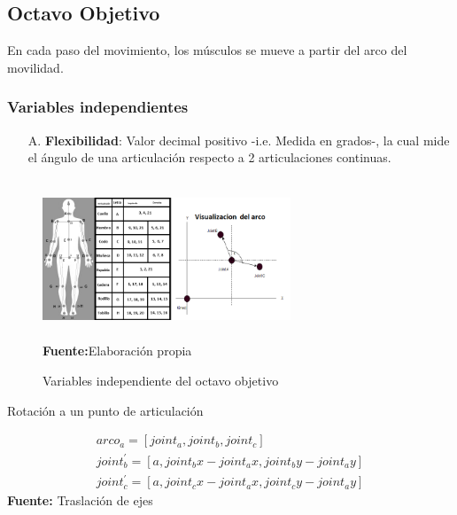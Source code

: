 \subsection{Octavo Objetivo} \label{vr:8o}
En cada paso del movimiento, los m\'usculos se mueve a partir del arco del  movilidad. 
\subsubsection{Variables independientes} \label{vr:8oi:indep}
\begin{enumerate}
	\item[A.] \textbf{Flexibilidad}: Valor decimal positivo -i.e. Medida en grados-, la cual mide el \'angulo de una articulaci\'on respecto a 2 articulaciones continuas.
\end{enumerate}	
\begin{figure}[H]
	\caption{Variables independiente del octavo  objetivo}
	\label{fig:varidep9}
	\centering
	\includegraphics[width=280px,height=180px]{graphics/EskeletanAngles.png} \\
	\textbf{Fuente:}Elaboraci\'on propia 
\end{figure}
\begin{formula}[h]
	\centering
	\caption{Rotaci\'on a un punto de articulaci\'on}
	\label{frm:rotEq}
	\begin{equation}
\begin{matrix}
arco_{a} = [joint_{a},joint_{b},joint_{c}]\\ 
joint_{b}^{'} = [a,joint_{b}x-joint_{a}x, joint_{b}y-joint_{a}y]\\ 
joint_{c}^{'} = [a,joint_{c}x-joint_{a}x, joint_{c}y-joint_{a}y]
\end{matrix}
	\end{equation}
	\textbf{Fuente:} Traslaci\'on de ejes \cite[p.~982]{aguilar2009matematicas}
\end{formula}  
